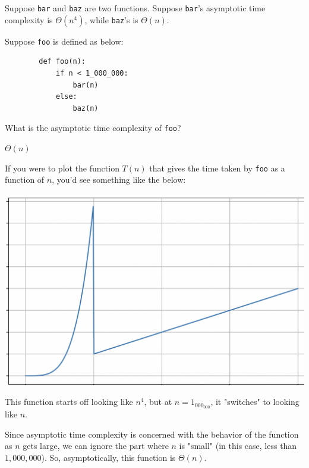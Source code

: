 \begin{prob}
    Suppose \texttt{bar} and \texttt{baz} are two functions.
    Suppose \texttt{bar}'s asymptotic time complexity is $\Theta(n^4)$, while
    \texttt{baz}'s is $\Theta(n)$.

    Suppose \texttt{foo} is defined as below:

    \begin{verbatim}
        def foo(n):
            if n < 1_000_000:
                bar(n)
            else:
                baz(n)
    \end{verbatim}

    What is the asymptotic time complexity of \texttt{foo}?

    \begin{soln}
        $\Theta(n)$

        If you were to plot the function $T(n)$ that gives the time taken by
        \texttt{foo} as a function of $n$, you'd see something like the below:

        \includegraphics{./plot.png}

        This function starts off looking like $n^4$, but at $n = 1_000_000$, it
        "switches" to looking like $n$.

        Since asymptotic time complexity is concerned with the behavior of the
        function as $n$ gets large, we can ignore the part where $n$ is "small"
        (in this case, less than $1{,}000{,}000$). So, asymptotically, this function
        is $\Theta(n)$.

    \end{soln}
\end{prob}
